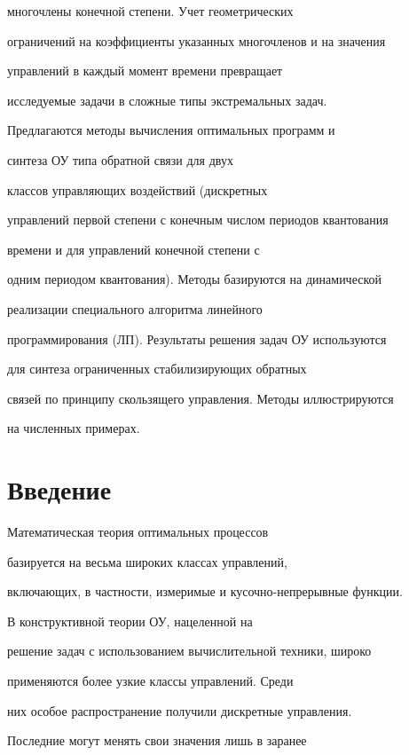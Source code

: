 многочлены конечной степени. Учет геометрических


ограничений на коэффициенты указанных многочленов и на значения


управлений в каждый момент времени превращает


исследуемые задачи в сложные типы экстремальных задач.


Предлагаются методы вычисления оптимальных программ и


синтеза ОУ типа обратной связи для двух


классов управляющих воздействий (дискретных


управлений первой степени с конечным числом периодов квантования


времени и для управлений конечной степени с


одним периодом квантования). Методы базируются на динамической


реализации специального алгоритма линейного


программирования (ЛП). Результаты решения задач ОУ используются


для синтеза ограниченных стабилизирующих обратных


связей по принципу скользящего управления. Методы иллюстрируются


на численных примерах.








\section{Введение}








Математическая теория оптимальных процессов \cite{Pontr}


базируется на весьма широких классах управлений,


включающих, в частности, измеримые и кусочно-непрерывные функции.


В конструктивной теории ОУ, нацеленной на


решение задач с использованием вычислительной техники, широко


применяются более узкие классы управлений. Среди


них особое распространение получили дискретные управления.


Последние могут менять свои значения лишь в заранее


